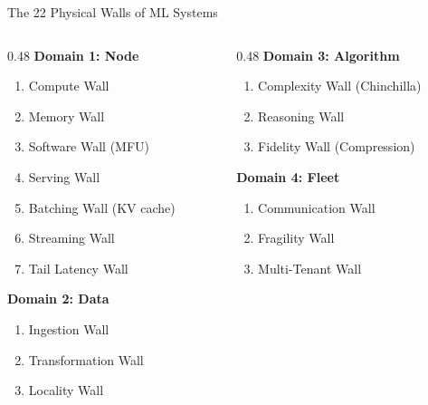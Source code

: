 \documentclass[aspectratio=169, 12pt]{beamer}
\begin{document}
\begin{frame}{The 22 Physical Walls of ML Systems}

\small
\begin{columns}[T]
\begin{column}{0.48\textwidth}
\textbf{Domain 1: Node}\\[2pt]
\begin{enumerate}\setlength\itemsep{1pt}
  \item Compute Wall
  \item Memory Wall
  \item Software Wall (MFU)
  \item Serving Wall
  \item Batching Wall (KV cache)
  \item Streaming Wall
  \item Tail Latency Wall
\end{enumerate}

\vspace{0.2cm}
\textbf{Domain 2: Data}\\[2pt]
\begin{enumerate}\setlength\itemsep{1pt}\setcounter{enumi}{7}
  \item Ingestion Wall
  \item Transformation Wall
  \item Locality Wall
\end{enumerate}
\end{column}

\begin{column}{0.48\textwidth}
\textbf{Domain 3: Algorithm}\\[2pt]
\begin{enumerate}\setlength\itemsep{1pt}\setcounter{enumi}{10}
  \item Complexity Wall (Chinchilla)
  \item Reasoning Wall
  \item Fidelity Wall (Compression)
\end{enumerate}

\vspace{0.2cm}
\textbf{Domain 4: Fleet}\\[2pt]
\begin{enumerate}\setlength\itemsep{1pt}\setcounter{enumi}{13}
  \item Communication Wall
  \item Fragility Wall
  \item Multi-Tenant Wall
\end{enumerate}


\end{column}
\end{columns}
\end{frame}
\end{document}
